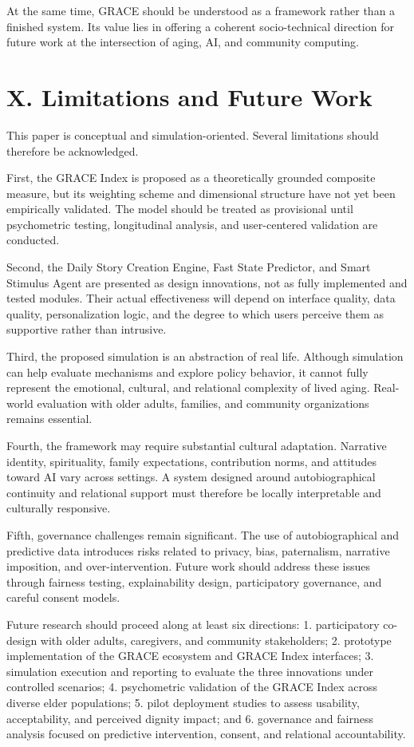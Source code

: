 \documentclass[
  journal,
]{IEEEtran}%
\begin{document}
At the same time, GRACE should be understood as a framework rather than
a finished system. Its value lies in offering a coherent socio-technical
direction for future work at the intersection of aging, AI, and
community computing.

\section{X. Limitations and Future
Work}\label{x.-limitations-and-future-work}

This paper is conceptual and simulation-oriented. Several limitations
should therefore be acknowledged.

First, the GRACE Index is proposed as a theoretically grounded composite
measure, but its weighting scheme and dimensional structure have not yet
been empirically validated. The model should be treated as provisional
until psychometric testing, longitudinal analysis, and user-centered
validation are conducted.

Second, the Daily Story Creation Engine, Fast State Predictor, and Smart
Stimulus Agent are presented as design innovations, not as fully
implemented and tested modules. Their actual effectiveness will depend
on interface quality, data quality, personalization logic, and the
degree to which users perceive them as supportive rather than intrusive.

Third, the proposed simulation is an abstraction of real life. Although
simulation can help evaluate mechanisms and explore policy behavior, it
cannot fully represent the emotional, cultural, and relational
complexity of lived aging. Real-world evaluation with older adults,
families, and community organizations remains essential.

Fourth, the framework may require substantial cultural adaptation.
Narrative identity, spirituality, family expectations, contribution
norms, and attitudes toward AI vary across settings. A system designed
around autobiographical continuity and relational support must therefore
be locally interpretable and culturally responsive.

Fifth, governance challenges remain significant. The use of
autobiographical and predictive data introduces risks related to
privacy, bias, paternalism, narrative imposition, and over-intervention.
Future work should address these issues through fairness testing,
explainability design, participatory governance, and careful consent
models.

Future research should proceed along at least six directions: 1.
participatory co-design with older adults, caregivers, and community
stakeholders; 2. prototype implementation of the GRACE ecosystem and
GRACE Index interfaces; 3. simulation execution and reporting to
evaluate the three innovations under controlled scenarios; 4.
psychometric validation of the GRACE Index across diverse elder
populations; 5. pilot deployment studies to assess usability,
acceptability, and perceived dignity impact; and 6. governance and
fairness analysis focused on predictive intervention, consent, and
relational accountability.
\end{document}
